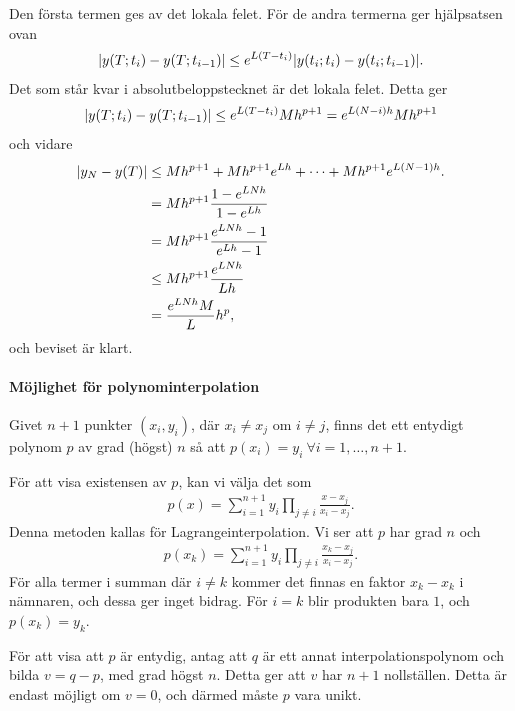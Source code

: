 Den första termen ges av det lokala felet. För de andra termerna ger hjälpsatsen ovan
\begin{align*}
	\abs{y(T; t_{i}) - y(T; t_{i - 1})} \leq e^{L(T - t_{i})}\abs{y(t_{i}; t_{i}) - y(t_{i}; t_{i - 1})}.
\end{align*}
Det som står kvar i absolutbeloppstecknet är det lokala felet. Detta ger
\begin{align*}
	\abs{y(T; t_{i}) - y(T; t_{i - 1})} \leq e^{L(T - t_{i})}Mh^{p + 1} = e^{L(N - i)h}Mh^{p + 1}
\end{align*}
och vidare
\begin{align*}
	\abs{y_{N} - y(T)} &\leq Mh^{p + 1} + Mh^{p + 1}e^{Lh} + \dots + Mh^{p + 1}e^{L(N - 1)h}. \\
	                   &= Mh^{p + 1}\frac{1 - e^{LNh}}{1 - e^{Lh}} \\
	                   &= Mh^{p + 1}\frac{e^{LNh} - 1}{e^{Lh} - 1} \\
	                   &\leq Mh^{p + 1}\frac{e^{LNh}}{Lh} \\
	                   &= \frac{e^{LNh}M}{L}h^{p},
\end{align*}
och beviset är klart.

\paragraph{Möjlighet för polynominterpolation}
Givet $n + 1$ punkter $(x_{i}, y_{i})$, där $x_{i}\neq x_{j}$ om $i\neq j$, finns det ett entydigt polynom $p$ av grad (högst) $n$ så att $p(x_{i}) = y_{i}\ \forall i= 1, \dots, n + 1$.

\proof
För att visa existensen av $p$, kan vi välja det som
\begin{align*}
	p(x) = \sum\limits_{i = 1}^{n + 1}y_{i}\prod\limits_{j\neq i}\frac{x - x_{j}}{x_{i} - x_{j}}.
\end{align*}
Denna metoden kallas för Lagrangeinterpolation. Vi ser att $p$ har grad $n$ och
\begin{align*}
	p(x_{k}) = \sum\limits_{i = 1}^{n + 1}y_{i}\prod\limits_{j\neq i}\frac{x_{k} - x_{j}}{x_{i} - x_{j}}.
\end{align*}
För alla termer i summan där $i\neq k$ kommer det finnas en faktor $x_{k} - x_{k}$ i nämnaren, och dessa ger inget bidrag. För $i = k$ blir produkten bara $1$, och $p(x_{k}) = y_{k}$.

För att visa att $p$ är entydig, antag att $q$ är ett annat interpolationspolynom och bilda $v = q - p$, med grad högst $n$. Detta ger att $v$ har $n + 1$ nollställen. Detta är endast möjligt om $v = 0$, och därmed måste $p$ vara unikt.

